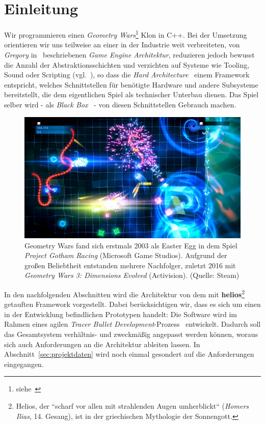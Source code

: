 \section{Einleitung}

Wir programmieren einen \textit{Geometry Wars}\footnote{siehe~\cite[]{WikipediaGeometryWars}} Klon in C++.
Bei der Umsetzung orientieren wir uns teilweise an einer in der Industrie weit verbreiteten, von \textit{Gregory} in~\cite[]{Gre19} beschriebenen \textit{Game Engine Architektur}, reduzieren jedoch bewusst die Anzahl der Abstraktionsschichten und verzichten auf Systeme wie Tooling, Sound oder Scripting (vgl.~\cite[\textbf{Figure 1.16}, 39]{Gre19}), so dass die \textit{Hard Architecture}~\cite[]{RM04} einem Framework entspricht, welches Schnittstellen für benötigte Hardware und andere Subsysteme bereitstellt, die dem eigentlichen Spiel als technischer Unterbau dienen.
Das Spiel selber wird - als \textit{Black Box}~\cite[]{RB88} - von diesen Schnittstellen Gebrauch machen.\\

\begin{figure}[!h]
    \centering
    \includegraphics[width=1\columnwidth]{img/geometry_wars}
    \caption{Geometry Wars fand sich erstmals 2003 als Easter Egg in dem Spiel \textit{Project Gotham Racing} (Microsoft Game Studios). Aufgrund der großen Beliebtheit entstanden mehrere Nachfolger, zuletzt 2016 mit \textit{Geometry Wars 3: Dimensions Evolved} (Activision). (Quelle: Steam)}
    \label{fig:geometry_wars}
\end{figure}

In den nachfolgenden Abschnitten wird die Architektur von dem mit \textbf{helios}\footnote{
    Helios, der ``scharf vor allen mit strahlenden Augen umherblickt`` (\textit{Homers Ilias}, 14. Gesang), ist in der griechischen Mythologie der Sonnengott.
} getauften Framework vorgestellt.
Dabei berücksichtigen wir, dass es sich um einen in der Entwicklung befindlichen Prototypen handelt:
Die Software wird im Rahmen eines agilen \textit{Tracer Bullet Development}-Prozess~\cite[50 f.]{TH20} entwickelt.
Dadurch soll das Gesamtsystem verhältnis- und zweckmäßig angepasst werden können, woraus sich auch Anforderungen an die Architektur ableiten lassen.
In Abschnitt~\ref{sec:projektdaten} wird noch einmal gesondert auf die Anforderungen eingegangen. \\

